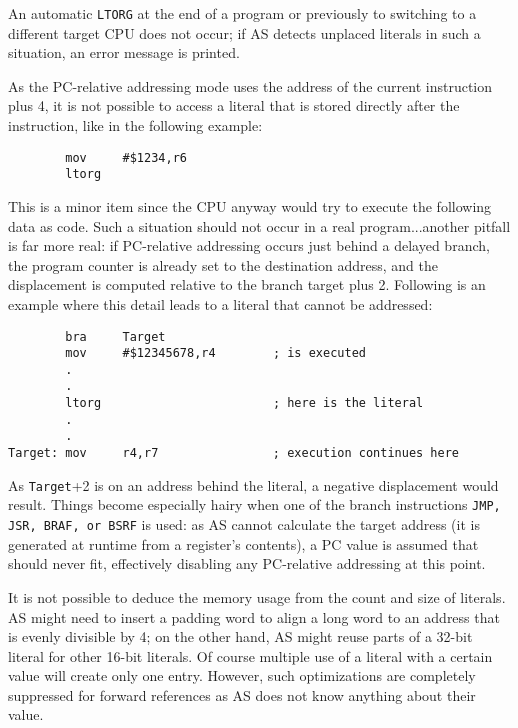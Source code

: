 \documentclass[12pt,twoside]{report}
\newcommand{\tty}[1]{{\tt #1}}
\begin{document}
An automatic \tty{LTORG} at the end of a program or previously to
switching to a different target CPU does not occur; if AS detects unplaced
literals in such a situation, an error message is printed.

As the PC-relative addressing mode uses the address of the current
instruction plus 4, it is not possible to access a literal that is
stored directly after the instruction, like in the following example:
\begin{verbatim}
        mov     #$1234,r6
        ltorg
\end{verbatim}
This is a minor item since the CPU anyway would try to execute the
following data as code.  Such a situation should not occur in a real
program...another pitfall is far more real: if PC-relative addressing
occurs just behind a delayed branch, the program counter is already
set to the destination address, and the displacement is computed
relative to the branch target plus 2.  Following is an example where
this detail leads to a literal that cannot be addressed:
\begin{verbatim}
        bra     Target
        mov     #$12345678,r4        ; is executed
        .
        .
        ltorg                        ; here is the literal
        .
        .
Target: mov     r4,r7                ; execution continues here
\end{verbatim}
As \tty{Target}+2 is on an address behind the literal, a negative
displacement would result.  Things become especially hairy when one
of the branch instructions \tty{JMP, JSR, BRAF, or BSRF} is used: as AS
cannot calculate the target address (it is generated at runtime from
a register's contents), a PC value is assumed that should never fit,
effectively disabling any PC-relative addressing at this point.

It is not possible to deduce the memory usage from the count and size
of literals.  AS might need to insert a padding word to align a long
word to an address that is evenly divisible by 4; on the other hand,
AS might reuse parts of a 32-bit literal for other 16-bit literals. 
Of course multiple use of a literal with a certain value will create
only one entry.  However, such optimizations are completely
suppressed for forward references as AS does not know anything about
their value.
\end{document}
